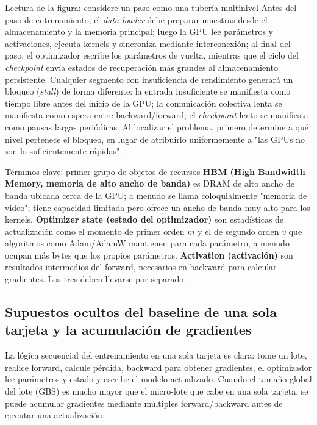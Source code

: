 
\begin{knowledgebox}{Lectura de la figura: considere un paso como una tubería multinivel}
Antes del paso de entrenamiento, el \textit{data loader} debe preparar muestras desde el almacenamiento y la memoria principal; luego la GPU lee parámetros y activaciones, ejecuta kernels y sincroniza mediante interconexión; al final del paso, el optimizador escribe los parámetros de vuelta, mientras que el ciclo del \textit{checkpoint} envía estados de recuperación más grandes al almacenamiento persistente. Cualquier segmento con insuficiencia de rendimiento generará un bloqueo (\textit{stall}) de forma diferente: la entrada insuficiente se manifiesta como tiempo libre antes del inicio de la GPU; la comunicación colectiva lenta se manifiesta como espera entre backward/forward; el \textit{checkpoint} lento se manifiesta como pausas largas periódicas. Al localizar el problema, primero determine a qué nivel pertenece el bloqueo, en lugar de atribuirlo uniformemente a "las GPUs no son lo suficientemente rápidas".
\end{knowledgebox}

\begin{knowledgebox}{Términos clave: primer grupo de objetos de recursos}
\textbf{HBM (High Bandwidth Memory, memoria de alto ancho de banda)} es DRAM de alto ancho de banda ubicada cerca de la GPU; a menudo se llama coloquialmente "memoria de video"; tiene capacidad limitada pero ofrece un ancho de banda muy alto para los kernels. \textbf{Optimizer state (estado del optimizador)} son estadísticas de actualización como el momento de primer orden $m$ y el de segundo orden $v$ que algoritmos como Adam/AdamW mantienen para cada parámetro; a menudo ocupan más bytes que los propios parámetros. \textbf{Activation (activación)} son resultados intermedios del forward, necesarios en backward para calcular gradientes. Los tres deben llevarse por separado.
\end{knowledgebox}

\subsection{Supuestos ocultos del baseline de una sola tarjeta y la acumulación de gradientes}

La lógica secuencial del entrenamiento en una sola tarjeta es clara: tome un lote, realice forward, calcule pérdida, backward para obtener gradientes, el optimizador lee parámetros y estado y escribe el modelo actualizado. Cuando el tamaño global del lote (GBS) es mucho mayor que el micro-lote que cabe en una sola tarjeta, se puede acumular gradientes mediante múltiples forward/backward antes de ejecutar una actualización.

